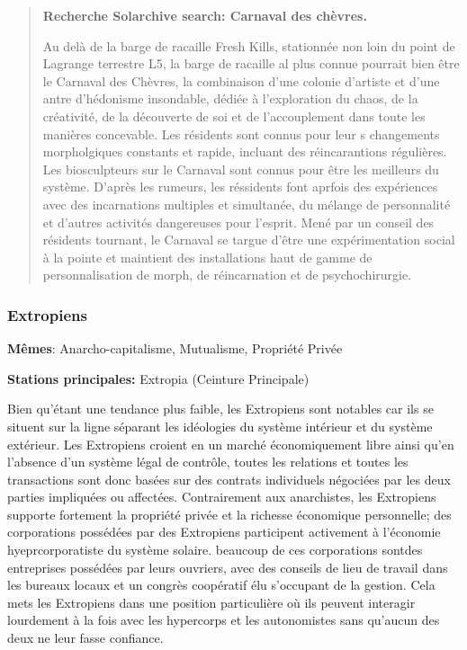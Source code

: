                                  \begin{quotation} \textbf{Recherche Solarchive search: Carnaval des chèvres.} 

                                    Au delà de la barge de racaille Fresh Kills, stationnée non loin du point de Lagrange terrestre L5, la barge de racaille al plus connue pourrait bien être le Carnaval des Chèvres, la combinaison d'une colonie d'artiste et d'une antre d'hédonisme insondable, dédiée à l'exploration du chaos, de la créativité, de la découverte de soi et de l'accouplement dans toute les manières concevable. Les résidents sont connus pour leur s changements morpholgiques constants et rapide, incluant des réincarantions régulières. Les biosculpteurs sur le Carnaval sont connus pour être les meilleurs du système. D'après les rumeurs, les réssidents font aprfois des expériences avec des incarnations multiples et simultanée, du mélange de personnalité et d'autres activités dangereuses pour l'esprit. Mené par un conseil des résidents tournant, le Carnaval se targue d'être une expérimentation social à la pointe et maintient des installations haut de gamme de personnalisation de morph, de réincarnation et de psychochirurgie. \end{quotation} 

                                    \subsubsection{Extropiens} \label{sec:extropians} 

                                    \textbf{Mêmes}: Anarcho-capitalisme, Mutualisme, Propriété Privée 

                                    \textbf{Stations principales:} Extropia (Ceinture Principale) 

                                    Bien qu'étant une tendance plus faible, les Extropiens sont notables car ils se situent sur la ligne séparant les idéologies du système intérieur et du système extérieur. Les Extropiens croient en un marché économiquement libre ainsi qu'en l'absence d'un système légal de contrôle, toutes les relations et toutes les transactions sont donc basées sur des contrats individuels négociées par les deux parties impliquées ou affectées. Contrairement aux anarchistes, les Extropiens supporte fortement la propriété privée et la richesse économique personnelle; des corporations possédées par des Extropiens participent activement à l'économie hyeprcorporatiste du système solaire. beaucoup de ces corporations sontdes entreprises possédées par leurs ouvriers, avec des conseils de lieu de travail dans les bureaux locaux et un congrès coopératif élu s'occupant de la gestion. Cela mets les Extropiens dans une position particulière où ils peuvent interagir lourdement à la fois avec les hypercorps et les autonomistes sans qu'aucun des deux ne leur fasse confiance. 


